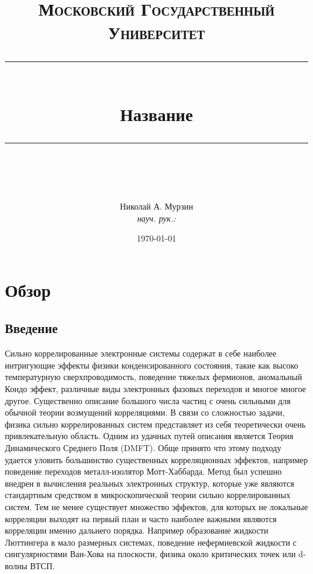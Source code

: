 \documentclass[11pt,a4paper]{report}
\begin{document}
\newcommand{\horrule}[1]{\rule{\linewidth}{#1}}   %

\title{
  \vspace{-1in}
  \normalfont \normalsize \textsc{Московский Государственный Университет} \\ [25pt]
  \horrule{0.5pt} \\[0.4cm]
  \huge Название \\
  \horrule{2pt} \\[0.5cm]
}
\author{
  \normalfont
  \normalsize
  {Николай А. Мурзин}\\[-3pt]
  \normalsize
  {\it{науч. рук.:} }\\[-3pt]
  \normalsize
}
\date{\today}
\maketitle
\tableofcontents

\chapter{Обзор}

\section{Введение}

Сильно коррелированные электронные системы содержат в себе наиболее интригующие эффекты физики конденсированного состояния, такие как высоко температурную сверхпроводимость, 
поведение тяжелых фермионов, аномальный Кондо эффект, различные виды электронных фазовых переходов и многое многое другое\cite{anderson1984basic}\cite{anderson1997theory}\cite{scalapino1995case}\cite{hewson1997kondo}.
Существенно описание большого числа частиц с очень сильными для обычной теории возмущений корреляциями. В связи со сложностью задачи, физика сильно коррелированных систем представляет из себя теоретически очень привлекательную область.
Одним из удачных путей описания является Теория Динамического Среднего Поля (DMFT)\cite{georges1996dynamical}\cite{kotliar2004strongly}. Обще принято что этому подходу удается уловить большинство существенных корреляционных эффектов, например поведение
переходов металл-изолятор Мотт-Хаббарда\cite{mott1974metal}. Метод был успешно внедрен в вычисления реальных электронных структур\cite{anisimov1997first}\cite{lichtenstein1998ab}, которые уже являются стандартным средством в микроскопической теории сильно коррелированных систем.
Тем не менее существует множество эффектов, для которых не локальные корреляции выходят на первый план и часто наиболее важными являются корреляции именно дальнего порядка. 
Например образование жидкости Люттингера в мало размерных системах\cite{anderson1997theory}\cite{mahan2000many}, поведение нефермиевской жидкости с сингулярностями Ван-Хова на плоскости\cite{irkhin2001effects}\cite{irkhin2002robustness},
физика около критических точек или d-волны ВТСП\cite{scalapino1995case}.
\end{document}
